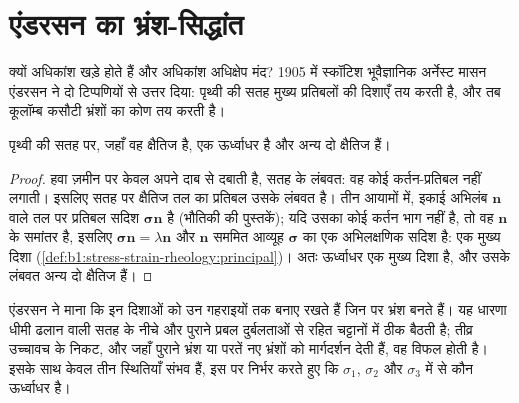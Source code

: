 \section{एंडरसन का भ्रंश-सिद्धांत}\label{sec:b1:faults-folds-fabrics:anderson}

क्यों अधिकांश  खड़े होते हैं और अधिकांश अधिक्षेप मंद? 1905 में स्कॉटिश भूवैज्ञानिक अर्नेस्ट मासन एंडरसन ने दो टिप्पणियों से उत्तर दिया: पृथ्वी की सतह मुख्य प्रतिबलों की दिशाएँ तय करती है, और तब कूलॉम्ब कसौटी भ्रंशों का कोण तय करती है।

\begin{proposition}[मुक्त सतह एक मुख्य तल बनाती है]\label{prop:b1:faults-folds-fabrics:free-surface}
पृथ्वी की सतह पर, जहाँ वह क्षैतिज है, एक  ऊर्ध्वाधर है और अन्य दो क्षैतिज हैं।
\end{proposition}

\begin{proof}
हवा ज़मीन पर केवल अपने दाब से दबाती है, सतह के लंबवत: वह कोई कर्तन-प्रतिबल नहीं लगाती। इसलिए सतह पर क्षैतिज तल का प्रतिबल उसके लंबवत है।
तीन आयामों में, इकाई अभिलंब $\mathbf n$ वाले तल पर प्रतिबल सदिश $\boldsymbol\sigma\mathbf n$ है (भौतिकी की पुस्तकें); यदि उसका कोई कर्तन भाग नहीं है, तो वह $\mathbf n$ के समांतर है, इसलिए
$\boldsymbol\sigma\mathbf n = \lambda\mathbf n$ और $\mathbf n$ सममित आव्यूह $\boldsymbol\sigma$ का एक अभिलक्षणिक सदिश है: एक मुख्य दिशा (\cref{def:b1:stress-strain-rheology:principal})। अतः ऊर्ध्वाधर एक मुख्य दिशा है, और उसके लंबवत अन्य दो क्षैतिज हैं।
\end{proof}

एंडरसन ने माना कि  इन दिशाओं को उन गहराइयों तक बनाए रखते हैं जिन पर भ्रंश बनते हैं। यह धारणा धीमी ढलान वाली सतह के नीचे और पुराने प्रबल दुर्बलताओं से रहित चट्टानों में ठीक बैठती है; तीव्र उच्चावच के निकट, और जहाँ पुराने भ्रंश या परतें नए भ्रंशों को मार्गदर्शन देती हैं, वह विफल होती है। इसके साथ केवल तीन स्थितियाँ संभव हैं, इस पर निर्भर करते हुए कि $\sigma_1$, $\sigma_2$ और $\sigma_3$ में से कौन ऊर्ध्वाधर है।

